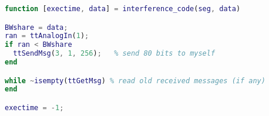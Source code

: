 \begin{lstlisting}[language=Matlab, caption={interference\textunderscore code.m}, label={listing:interference_code}]
function [exectime, data] = interference_code(seg, data)

BWshare = data;
ran = ttAnalogIn(1);
if ran < BWshare
  ttSendMsg(3, 1, 256);   % send 80 bits to myself
end

while ~isempty(ttGetMsg) % read old received messages (if any)
end

exectime = -1;

\end{lstlisting}

